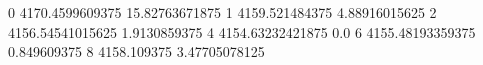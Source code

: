 0 4170.4599609375 15.82763671875
1 4159.521484375 4.88916015625
2 4156.54541015625 1.9130859375
4 4154.63232421875 0.0
6 4155.48193359375 0.849609375
8 4158.109375 3.47705078125
